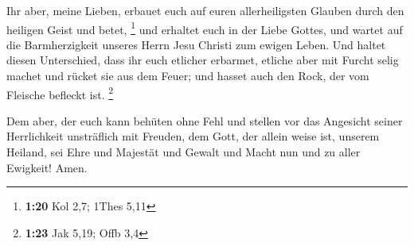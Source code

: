 Ihr aber, meine Lieben, erbauet euch auf euren
allerheiligsten Glauben durch den heiligen Geist und betet, \footnote{\textbf{1:20}
  Kol 2,7; 1Thes 5,11}  und erhaltet euch in der Liebe
Gottes, und wartet auf die Barmherzigkeit unseres Herrn Jesu Christi zum
ewigen Leben.  Und haltet diesen Unterschied, dass ihr
euch etlicher erbarmet,  etliche aber mit Furcht selig
machet und rücket sie aus dem Feuer; und hasset auch den Rock, der vom
Fleische befleckt ist. \footnote{\textbf{1:23} Jak 5,19; Offb 3,4}

 Dem aber, der euch kann behüten ohne Fehl und stellen
vor das Angesicht seiner Herrlichkeit unsträflich mit Freuden,
 dem Gott, der allein weise ist, unserem Heiland, sei
Ehre und Majestät und Gewalt und Macht nun und zu aller Ewigkeit! Amen.
